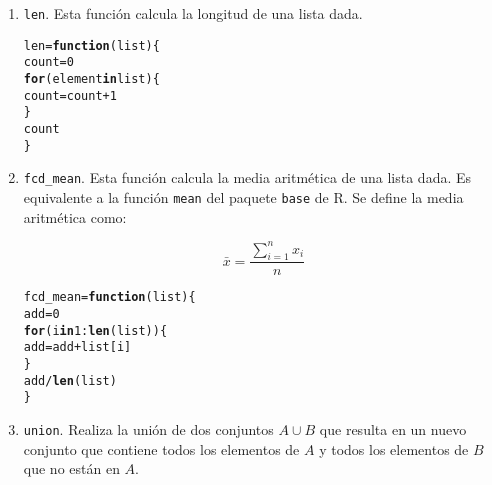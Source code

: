\documentclass[12pt]{report}\usepackage[]{graphicx}\usepackage[dvipsnames]{xcolor}
\makeatletter
\newcommand{\hlnum}[1]{\textcolor[rgb]{0.686,0.059,0.569}{#1}}%
\newcommand{\hlopt}[1]{\textcolor[rgb]{0,0,0}{#1}}%
\newcommand{\hlstd}[1]{\textcolor[rgb]{0.345,0.345,0.345}{#1}}%
\newcommand{\hlkwa}[1]{\textcolor[rgb]{0.161,0.373,0.58}{\textbf{#1}}}%
\newcommand{\hlkwb}[1]{\textcolor[rgb]{0.69,0.353,0.396}{#1}}%
\newcommand{\hlkwc}[1]{\textcolor[rgb]{0.333,0.667,0.333}{#1}}%
\newcommand{\hlkwd}[1]{\textcolor[rgb]{0.737,0.353,0.396}{\textbf{#1}}}%
\newenvironment{kframe}{%
 \def\at@end@of@kframe{}%
 \ifinner\ifhmode%
  \def\at@end@of@kframe{\end{minipage}}%
  \begin{minipage}{\columnwidth}%
 \fi\fi%
 \def\FrameCommand##1{\hskip\@totalleftmargin \hskip-\fboxsep
 \colorbox{shadecolor}{##1}\hskip-\fboxsep
     \hskip-\linewidth \hskip-\@totalleftmargin \hskip\columnwidth}%
 \MakeFramed {\advance\hsize-\width
   \@totalleftmargin\z@ \linewidth\hsize
   \@setminipage}}%
 {\par\unskip\endMakeFramed%
 \at@end@of@kframe}
\newenvironment{knitrout}{}{} %
\makeatother
\begin{document}
		 	\begin{enumerate}[label = \textbf{\arabic*.}]
		 		\item \texttt{len}. Esta función calcula la longitud de una lista dada.
			 		
\begin{knitrout}
\color{fgcolor}\begin{kframe}
\begin{alltt}
\hlstd{len} \hlkwb{=} \hlkwa{function}\hlstd{(}\hlkwc{list}\hlstd{) \{}
        \hlstd{count} \hlkwb{=} \hlnum{0}
        \hlkwa{for} \hlstd{(element} \hlkwa{in} \hlstd{list) \{}
                \hlstd{count} \hlkwb{=} \hlstd{count} \hlopt{+} \hlnum{1}
        \hlstd{\}}
        \hlstd{count}
\hlstd{\}}
\end{alltt}
\end{kframe}
\end{knitrout}
		 		
		 		\item \texttt{fcd\_mean}. Esta función calcula la media aritmética de una lista dada. Es equivalente a la función \texttt{mean} del paquete \texttt{base} de R. Se define la media aritmética como:
		 		
		 		$$
		 		\bar{x} = \frac{\displaystyle\sum_{i=1}^n x_i}{n}
		 		$$
		 		
\begin{knitrout}
\color{fgcolor}\begin{kframe}
\begin{alltt}
\hlstd{fcd_mean} \hlkwb{=} \hlkwa{function}\hlstd{(}\hlkwc{list}\hlstd{) \{}
        \hlstd{add} \hlkwb{=} \hlnum{0}
        \hlkwa{for} \hlstd{(i} \hlkwa{in} \hlnum{1}\hlopt{:}\hlkwd{len}\hlstd{(list)) \{}
                \hlstd{add} \hlkwb{=} \hlstd{add} \hlopt{+} \hlstd{list[i]}
        \hlstd{\}}
        \hlstd{add} \hlopt{/} \hlkwd{len}\hlstd{(list)}
\hlstd{\}}
\end{alltt}
\end{kframe}
\end{knitrout}
		 		
		 		\item \texttt{union}. Realiza la unión de dos conjuntos $A \cup B$ que resulta en un nuevo conjunto que contiene todos los elementos de $A$ y todos los elementos de $B$ que no están en $A$.
		 		

\end{enumerate}
\end{document}
